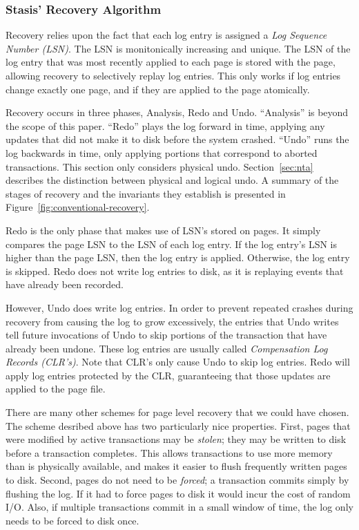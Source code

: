 \documentclass[letterpaper,twocolumn,10pt]{article}
\newcommand{\yads}{Stasis'\xspace}
\begin{document}
\subsubsection{\yads Recovery Algorithm}

Recovery relies upon the fact that each log entry is assigned a {\em
Log Sequence Number (LSN)}.  The LSN is monitonically increasing and
unique.  The LSN of the log entry that was most recently applied to
each page is stored with the page, allowing recovery to selectively
replay log entries.  This only works if log entries change exactly one
page, and if they are applied to the page atomically.

Recovery occurs in three phases, Analysis, Redo and Undo.
``Analysis'' is beyond the scope of this paper.  ``Redo'' plays the
log forward in time, applying any updates that did not make it to disk
before the system crashed.  ``Undo'' runs the log backwards in time,
only applying portions that correspond to aborted transactions.  This
section only considers physical undo.  Section~\ref{sec:nta} describes
the distinction between physical and logical undo.
A summary of the stages of recovery and the invariants
they establish is presented in Figure~\ref{fig:conventional-recovery}.

Redo is the only phase that makes use of LSN's stored on pages.
It simply compares the page LSN to the LSN of each log entry.  If the
log entry's LSN is higher than the page LSN, then the log entry is
applied.  Otherwise, the log entry is skipped.  Redo does not write
log entries to disk, as it is replaying events that have already been
recorded.  

However, Undo does write log entries.  In order to prevent repeated
crashes during recovery from causing the log to grow excessively, the
entries that Undo writes tell future invocations of Undo to skip
portions of the transaction that have already been undone.  These log
entries are usually called {\em Compensation Log Records (CLR's)}.
Note that CLR's only cause Undo to skip log entries.  Redo will apply
log entries protected by the CLR, guaranteeing that those updates are
applied to the page file.

There are many other schemes for page level recovery that we could
have chosen.  The scheme desribed above has two particularly nice
properties.  First, pages that were modified by active transactions
may be {\em stolen}; they may be written to disk before a transaction
completes.  This allows transactions to use more memory than is
physically available, and makes it easier to flush frequently written
pages to disk.  Second, pages do not need to be {\em forced}; a
transaction commits simply by flushing the log.  If it had to force
pages to disk it would incur the cost of random I/O.  Also, if
multiple transactions commit in a small window of time, the log only
needs to be forced to disk once.
\end{document}

